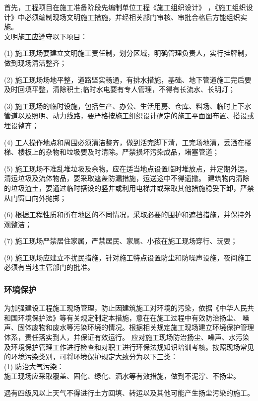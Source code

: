 首先，工程项目在施工准备阶段先编制单位工程《施工组织设计》
，《施工组织设计》中必须编制现场文明施工措施，并经相关部门审核、审批合格后方能组织实施。\\

文明施工应遵守以下项目：

(1) 施工现场要建立文明施工责任制，划分区域，明确管理负责人，实行挂牌制，做到现场清洁整齐；

(2) 施工现场场地平整，道路坚实畅通，有排水措施，基础、地下管道施工完后要及时回填平整，清除积土;临时水电要有专人管理，不得有长流水、长明灯；

(3) 施工现场的临时设施，包括生产、办公、生活用房、仓库、料场、临时上下水管道以及照明、动力线路，要严格按施工组织设计确定的施工平面图布置、搭设或埋设整齐；

(4) 工人操作地点和周围必须清洁整齐，做到活完脚下清，工完场地清，丢洒在楼梯、楼板上的杂物和垃圾要及时清除。严禁损坏污染成品，堵塞管道；

(5) 施工现场不准乱堆垃圾及余物。应在适当地点设置临时堆放点，并定期外运。清运垃圾及流体物品，要采取遮盖防漏措施，运送途中不得遗撒。
建筑物内清除的垃圾渣土，要通过临时搭设的竖井或利用电梯井或采取其他措施稳妥下卸，严禁从门窗口向外抛掷；

(6) 根据工程性质和所在地区的不同情况，采取必要的围护和遮挡措施，并保持外观整洁；

(7) 施工现场严禁居住家属，严禁居民、家属、小孩在施工现场穿行、玩耍；

(9) 施工现场应建立不扰民措施，针对施工特点设置防尘和防噪声设施，夜间施工必须有当地主管部门的批准。

\subsubsection{环境保护}

为加强建设工程施工现场管理，防止因建筑施工对环境的污染，依据《中华人民共和国环境保护法》等有关规定制定本措施，意在在施工过程中有效防治扬尘、
噪声、固体废物和废水等污染环境的情况。根据相关规定施工现场建立环境保护管理体系，责任落实到人，并保证有效运行。
应对施工现场防治扬尘、噪声、水污染及环境保护管理工作进行检查和对职工进行环保法规知识培训考核。按照现场常见的环境污染类别，可将环境保护规定大致分为以下三类：\\

(1) 防治大气污染：\\

 施工现场应采取覆盖、固化、绿化、洒水等有效措施，做到不泥泞、不扬尘。

 遇有四级风以上天气不得进行土方回填、转运以及其他可能产生扬尘污染的施工。  


